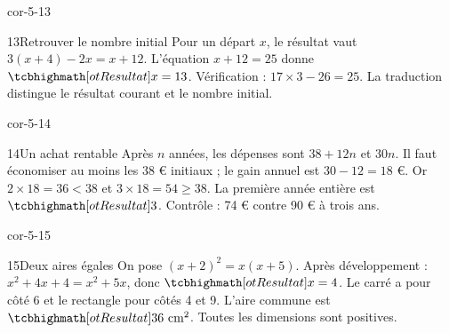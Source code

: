 \begin{blocLivre}{cor-5-13}\begin{corrige}{13}{Retrouver le nombre initial}
Pour un départ $x$, le résultat vaut $3(x+4)-2x=x+12$. L’équation $x+12=25$ donne $\res{x=13}$. Vérification : $17\times3-26=25$. La traduction distingue le résultat courant et le nombre initial.
\end{corrige}\end{blocLivre}
\begin{blocLivre}{cor-5-14}\begin{corrige}{14}{Un achat rentable}
Après $n$ années, les dépenses sont $38+12n$ et $30n$. Il faut économiser au moins les 38 € initiaux ; le gain annuel est $30-12=18$ €. Or $2\times18=36<38$ et $3\times18=54\ge38$. La première année entière est $\res3$. Contrôle : 74 € contre 90 € à trois ans.
\end{corrige}\end{blocLivre}
\begin{blocLivre}{cor-5-15}\begin{corrige}{15}{Deux aires égales}
On pose $(x+2)^2=x(x+5)$. Après développement : $x^2+4x+4=x^2+5x$, donc $\res{x=4}$. Le carré a pour côté 6 et le rectangle pour côtés 4 et 9. L’aire commune est $\res{36\text{ cm}^2}$. Toutes les dimensions sont positives.
\label{fig-cor-5-15}
\end{corrige}\end{blocLivre}
